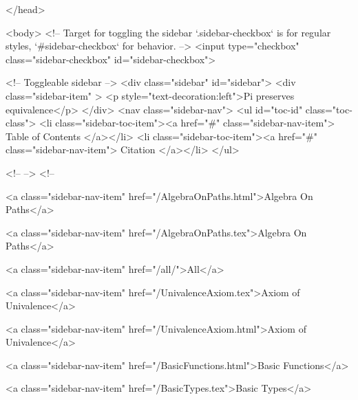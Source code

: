   
</head>




  <body>
    <!-- Target for toggling the sidebar `.sidebar-checkbox` is for regular
     styles, `#sidebar-checkbox` for behavior. -->
<input type="checkbox" class="sidebar-checkbox" id="sidebar-checkbox">

<!-- Toggleable sidebar -->
<div class="sidebar" id="sidebar">
  <div class="sidebar-item" >
    <p style="text-decoration:left">Pi preserves equivalence</p>
  </div>
  <nav class="sidebar-nav">
    <ul id="toc-id" class="toc-class">
  <li class="sidebar-toc-item"><a href="#" class="sidebar-nav-item"> Table of Contents </a></li>
  <li class="sidebar-toc-item"><a href="#" class="sidebar-nav-item"> Citation </a></li>
</ul>


    <!--  -->
    <!-- 
      
    
      
    
      
    
      
        
      
    
      
        
          <a class="sidebar-nav-item" href="/AlgebraOnPaths.html">Algebra On Paths</a>
        
      
    
      
        
          <a class="sidebar-nav-item" href="/AlgebraOnPaths.tex">Algebra On Paths</a>
        
      
    
      
        
          <a class="sidebar-nav-item" href="/all/">All</a>
        
      
    
      
        
          <a class="sidebar-nav-item" href="/UnivalenceAxiom.tex">Axiom of Univalence</a>
        
      
    
      
        
          <a class="sidebar-nav-item" href="/UnivalenceAxiom.html">Axiom of Univalence</a>
        
      
    
      
        
          <a class="sidebar-nav-item" href="/BasicFunctions.html">Basic Functions</a>
        
      
    
      
        
          <a class="sidebar-nav-item" href="/BasicTypes.tex">Basic Types</a>
        
